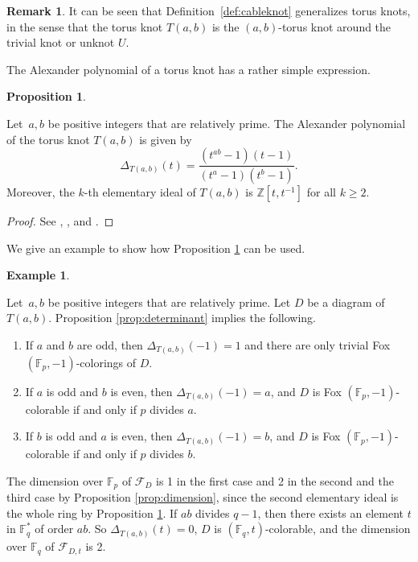 \documentclass[11pt,a4paper]{article}
\theoremstyle{definition}
\newtheorem{proposition}[theorem]{Proposition}
\newtheorem{example}[theorem]{Example}
\newtheorem{remark}[theorem]{Remark}
\newcommand{\numberset}{\mathbb}
\newcommand{\F}{\numberset{F}}
\newcommand{\Z}{\numberset{Z}}
\newcommand{\mF}{\mathcal{F}}
\begin{document}
\begin{remark}
    It can be seen that Definition~\ref{def:cableknot} generalizes torus knots, in the sense that the torus knot $T(a,b)$ is the $(a,b)$-torus knot around the trivial knot or unknot $U$.
\end{remark}

The Alexander polynomial of a torus knot has a rather simple expression.
 
\begin{proposition}\label{p-alex-torus}

Let~$a,b$ be positive integers that are relatively prime.
The Alexander polynomial of the torus knot $T(a,b)$ is given by 
$$
\Delta_{T(a,b)}(t) =\frac{(t^{ab}-1)(t-1)}{(t^a-1)(t^b-1)}.
$$
Moreover, the $k$-th elementary ideal of $T(a,b)$ is $\Z[t,t^{-1}]$ for all $k \geq 2$.
\end{proposition}
\begin{proof}
See  \cite[Chapter 3]{burau1934knots}, \cite[VIII Exercise 3]{crowell2012introduction}, 
and \cite[Theorem 7.3.2]{murasugi1996knot}.
\end{proof}

We give an example to show how Proposition \ref{p-alex-torus} can be used.



\begin{example}\label{ex:torus}

Let~$a,b$ be positive integers that are relatively prime. Let $D$ be a diagram of $T(a,b)$. Proposition \ref{prop:determinant} implies the following.
\begin{enumerate}
    \item If $a$ and $b$ are odd, then $\Delta_{T(a,b)}(-1)=1$ and there are only trivial Fox $(\F_p,-1)$-colorings of $D$.
    \item If $a$ is odd and $b$ is even, then $\Delta_{T(a,b)}(-1)=a$, and $D$ is Fox $(\F_p,-1)$-colorable if and only if $p$ divides $a$.
    \item If $b$ is odd and $a$ is even, then $\Delta_{T(a,b)}(-1)=b$, and $D$ is Fox $(\F_p,-1)$-colorable if and only if $p$ divides $b$.
\end{enumerate}

The dimension over $\F_p$ of $\mF_D$ is 1 in the first case and 2 in the second and the third case by Proposition \ref{prop:dimension}, since the second elementary ideal is the whole ring by Proposition \ref{p-alex-torus}. If $ab$ divides $q-1$, then there exists an element $t$ in $\F_q^*$ of order $ab$. So $\Delta_{T(a,b)}(t)=0$, $D$ is $(\F_q,t)$-colorable, and the dimension over $\F_q$ of $\mF_{D,t}$ is 2.
\end{example}
\end{document}
